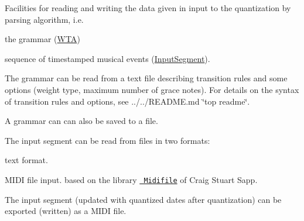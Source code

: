 Facilities for reading and writing the data given in input to the quantization by parsing algorithm, i.\+e.


\begin{DoxyItemize}
\item the grammar ({\ttfamily \mbox{\hyperlink{classWTA}{W\+TA}}})
\item sequence of timestamped musical events ({\ttfamily \mbox{\hyperlink{classInputSegment}{Input\+Segment}}}).
\end{DoxyItemize}

The grammar can be read from a text file describing transition rules and some options (weight type, maximum number of grace notes). For details on the syntax of transition rules and options, see ../../\+R\+E\+A\+D\+ME.md \char`\"{}top readme\char`\"{}.

A grammar can can also be saved to a file.

The input segment can be read from files in two formats\+:


\begin{DoxyItemize}
\item text format.
\item M\+I\+DI file input. based on the library \href{http://midifile.sapp.org}{\texttt{ Midifile}} of Craig Stuart Sapp.
\end{DoxyItemize}

The input segment (updated with quantized dates after quantization) can be exported (written) as a M\+I\+DI file. 